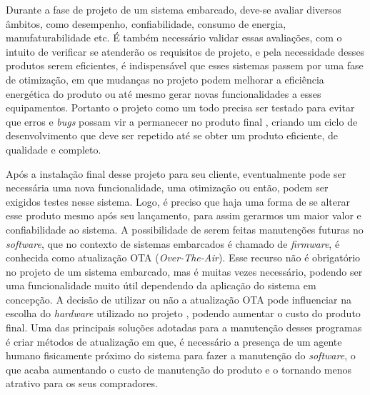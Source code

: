 

Durante a fase de projeto de um sistema embarcado, deve-se avaliar diversos âmbitos, como desempenho, confiabilidade, consumo de energia, manufaturabilidade etc. É também necessário validar essas avaliações, com o intuito de verificar se atenderão os requisitos de projeto, e pela necessidade desses produtos serem eficientes, é indispensável que esses sistemas passem por uma fase de otimização, em que mudanças no projeto podem melhorar a eficiência energética do produto ou até mesmo gerar novas funcionalidades a esses equipamentos. Portanto o projeto como um todo precisa ser testado para evitar que erros e \textit{bugs} possam vir a permanecer no produto final \cite{Marwedel2006}, criando um ciclo de desenvolvimento que deve ser repetido até se obter um produto eficiente, de qualidade e completo.

Após a instalação final desse projeto para seu cliente, eventualmente pode ser necessária uma nova funcionalidade, uma otimização ou então, podem ser exigidos testes nesse sistema. Logo, é preciso que haja uma forma de se alterar esse produto mesmo após seu lançamento, para assim gerarmos um maior valor e confiabilidade ao sistema.
A possibilidade de serem feitas manutenções futuras no \textit{software}, que no contexto de sistemas embarcados é chamado de \textit{firmware}, é conhecida como atualização OTA (\textit{Over-The-Air}). Esse recurso não é obrigatório no projeto de um sistema embarcado, mas é muitas vezes necessário, podendo ser uma funcionalidade muito útil dependendo da aplicação do sistema em concepção. A decisão de utilizar ou não a atualização OTA pode influenciar na escolha do \textit{hardware} utilizado no projeto \cite{Ball2002}, 
podendo aumentar o custo do produto final.
Uma das principais soluções adotadas para a manutenção desses programas é criar métodos de atualização em que, é necessário a presença de um agente humano fisicamente próximo do sistema para fazer a manutenção do \textit{software}, o que acaba aumentando o custo de manutenção do produto e o tornando menos atrativo para os seus compradores.

